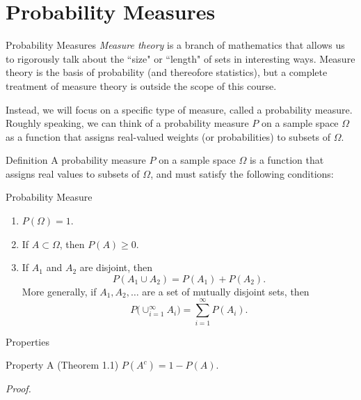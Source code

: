 \section{Probability Measures}

\begin{frame}{Probability Measures}
\emph{Measure theory} is a branch of mathematics that allows us to rigorously talk about the ``size" or ``length" of sets in interesting ways.
Measure theory is the basis of probability (and thereofore statistics), but a complete treatment of measure theory is outside the scope of this course. 

Instead, we will focus on a specific type of measure, called a \alert{probability measure}.
Roughly speaking, we can think of a probability measure $P$ on a sample space $\Omega$ as a function that assigns real-valued weights (or probabilities) to subsets of $\Omega$.
\end{frame}

\begin{frame}{Definition}
  A probability measure $P$ on a sample space $\Omega$ is a function that assigns real values to subsets of $\Omega$, and must satisfy the following conditions:
  \begin{block}{Probability Measure}
    \begin{enumerate}
      \item $P(\Omega) = 1$. 
      \item If $A \subset \Omega$, then $P(A) \geq 0$.
      \item If $A_1$ and $A_2$ are disjoint, then
      $$
      P(A_1 \cup A_2) = P(A_1) + P(A_2).
      $$
      More generally, if $A_1, A_2, \ldots$ are a set of mutually disjoint sets, then
      $$
      P\big(\cup_{i = 1}^\infty A_i\big) = \sum_{i = 1}^\infty P(A_i).
      $$
    \end{enumerate}
  \end{block}
\end{frame}

\begin{frame}{Properties}
  \begin{block}{Property A (Theorem 1.1)}
    $P(A^c) = 1 - P(A)$.
  \end{block}
  \emph{Proof.}
  
  
\end{frame}

